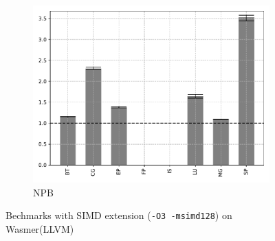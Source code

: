 \begin{figure}
\begin{subfigure}[t]{.45\textwidth}
        \includegraphics[width=\textwidth]
        {Images/6.1.RQ1/npb-wasmer-llvm-simd.pdf}
        \caption{NPB}
    \end{subfigure}
    \caption{Bechmarks with SIMD extension (\texttt{-O3 -msimd128}) on Wasmer(LLVM)}
    \label{fig:rq1-wasmer-llvm-simd}
\end{figure}

